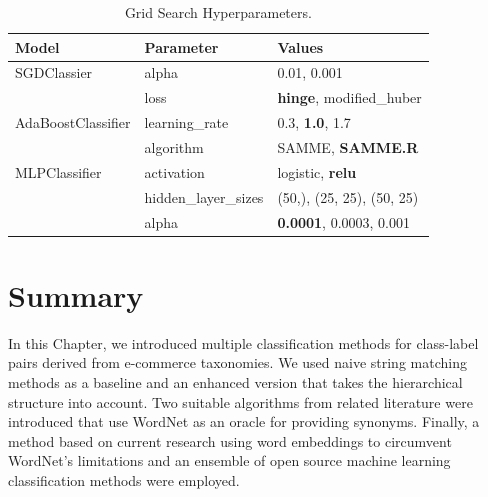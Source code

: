 \begin{table}[htbp]
    \begin{center}
        \begin{tabular}{l|l|l}
            Model              & Parameter            & Values \\
            \hline
            SGDClassier        & alpha                & 0.01, 0.001 \\
                               & loss                 & \textbf{hinge}, modified\_huber \\
            AdaBoostClassifier & learning\_rate       & 0.3, \textbf{1.0}, 1.7 \\
                               & algorithm            & SAMME, \textbf{SAMME.R} \\
            MLPClassifier      & activation           & logistic, \textbf{relu} \\
                               & hidden\_layer\_sizes & (50,), (25, 25), (50, 25) \\
                               & alpha                & \textbf{0.0001}, 0.0003, 0.001 \\
        \end{tabular}
        \caption{Grid Search Hyperparameters.}
        \label{tab:grid-search}
    \end{center}
\end{table}

\section{Summary}

In this Chapter, we introduced multiple classification methods for class-label pairs derived from e-commerce taxonomies.
We used naive string matching methods as a baseline and an enhanced version that takes the hierarchical structure into account.
Two suitable algorithms from related literature were introduced that use WordNet as an oracle for providing synonyms.
Finally, a method based on current research using word embeddings to circumvent WordNet's limitations and
an ensemble of open source machine learning classification methods were employed.

